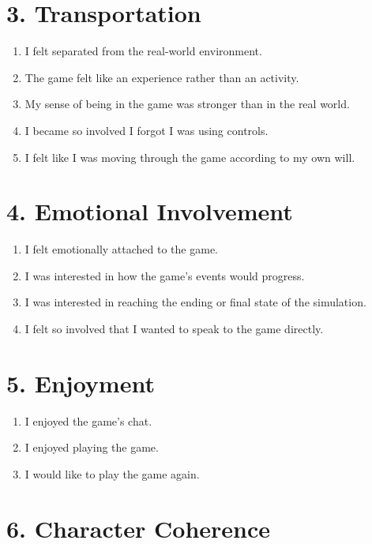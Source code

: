 \documentclass[12pt]{article}
\begin{document}
\section*{3. Transportation}

\begin{enumerate}[resume]
  \item I felt separated from the real-world environment.
  \item The game felt like an experience rather than an activity.
  \item My sense of being in the game was stronger than in the real world.
  \item I became so involved I forgot I was using controls.
  \item I felt like I was moving through the game according to my own will.
\end{enumerate}

\section*{4. Emotional Involvement}

\begin{enumerate}[resume]
  \item I felt emotionally attached to the game.
  \item I was interested in how the game’s events would progress.
  \item I was interested in reaching the ending or final state of the simulation.
  \item I felt so involved that I wanted to speak to the game directly.
\end{enumerate}

\section*{5. Enjoyment}

\begin{enumerate}[resume]
  \item I enjoyed the game’s chat.
  \item I enjoyed playing the game.
  \item I would like to play the game again.
\end{enumerate}

\section*{6. Character Coherence}
\end{document}
